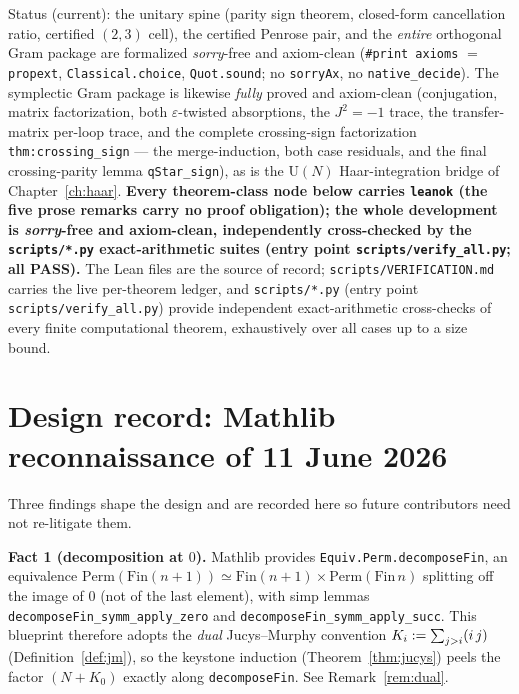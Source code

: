 Status (current): the unitary spine (parity sign theorem, closed-form
cancellation ratio, certified $(2,3)$ cell), the certified Penrose pair, and
the \emph{entire} orthogonal Gram package are formalized \emph{sorry}-free and
axiom-clean (\texttt{\#print axioms} $=$ \texttt{propext}, \texttt{Classical.choice},
\texttt{Quot.sound}; no \texttt{sorryAx}, no \texttt{native\_decide}). The
symplectic Gram package is likewise \emph{fully} proved and axiom-clean
(conjugation, matrix factorization, both $\varepsilon$-twisted absorptions, the
$J^2=-1$ trace, the transfer-matrix per-loop trace, and the complete crossing-sign
factorization \texttt{thm:crossing\_sign} --- the merge-induction, both case
residuals, and the final crossing-parity lemma \texttt{qStar\_sign}), as is the
$\mathrm U(N)$ Haar-integration bridge of Chapter~\ref{ch:haar}. \textbf{Every
theorem-class node below carries \texttt{leanok} (the five prose remarks carry
no proof obligation); the whole development is \emph{sorry}-free and
axiom-clean, independently cross-checked by the \texttt{scripts/*.py} exact-arithmetic
suites (entry point \texttt{scripts/verify\_all.py}; all PASS).} The Lean files are the source of record;
\texttt{scripts/VERIFICATION.md} carries the live
per-theorem ledger, and \texttt{scripts/*.py} (entry point \texttt{scripts/verify\_all.py})
provide independent exact-arithmetic cross-checks of every finite computational
theorem, exhaustively over all cases up to a size bound.

\section*{Design record: Mathlib reconnaissance of 11 June 2026}

Three findings shape the design and are recorded here so future
contributors need not re-litigate them.

\textbf{Fact 1 (decomposition at $0$).} Mathlib provides
\texttt{Equiv.Perm.decomposeFin}, an equivalence
$\mathrm{Perm}(\mathrm{Fin}(n{+}1)) \simeq
\mathrm{Fin}(n{+}1)\times\mathrm{Perm}(\mathrm{Fin}\,n)$ splitting off the
image of $0$ (not of the last element), with simp lemmas
\texttt{decomposeFin\_symm\_apply\_zero} and
\texttt{decomposeFin\_symm\_apply\_succ}. This blueprint therefore adopts
the \emph{dual} Jucys--Murphy convention $K_i:=\sum_{j>i}(i\,j)$
(Definition~\ref{def:jm}), so the keystone induction
(Theorem~\ref{thm:jucys}) peels the factor $(N+K_0)$ exactly along
\texttt{decomposeFin}. See Remark~\ref{rem:dual}.

